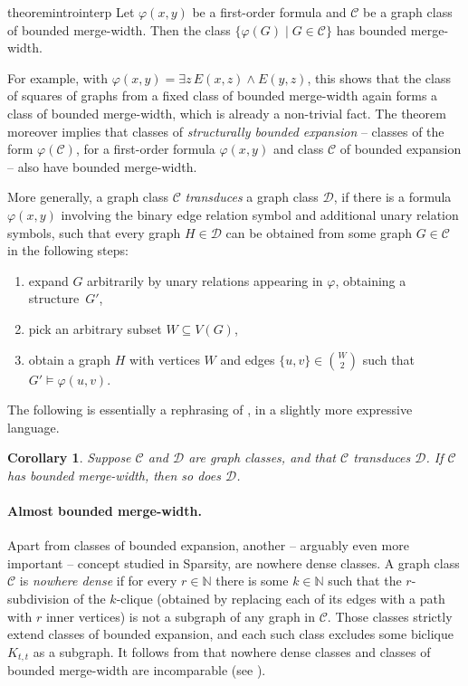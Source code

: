 \documentclass[11pt]{article}
\newtheorem{corollary}[theorem]{Corollary}
\theoremstyle{remark}
\newcommand{\set}[1]{\{#1\}}
\newcommand{\setof}[2]{\set{#1\mid#2}}
\def\phi{\varphi}
\def\cal{\mathcal}
\def\N{\mathbb N}
\renewcommand{\subset}{\subseteq}
\newcommand{\CC}{\cal C}
\newcommand{\DD}{\cal D}
\begin{document}
\begin{restatable}{theorem}{introinterp}\label{thm:interp}
  Let $\phi(x,y)$ be a first-order formula and
   $\CC$ be a graph class of bounded merge-width.
  Then the class $\setof{\phi(G)}{G\in\CC}$ has bounded merge-width.
\end{restatable}


For example, with \(\phi(x,y)=\exists z \,E(x,z) \land E(y,z)\),
this shows that the class of squares of graphs from a fixed class of bounded merge-width again forms a class of bounded merge-width, which is already a non-trivial fact.
The theorem moreover implies that classes
of \emph{structurally bounded expansion} \cite{lsd-journal}
-- classes of the form $\phi(\CC)$, for a first-order formula $\phi(x,y)$ and  class $\CC$ of bounded expansion -- also have bounded merge-width.

More generally, a graph class $\CC$ \emph{transduces} a graph class $\DD$,
if there is a formula $\phi(x,y)$ involving the binary edge relation symbol and additional unary relation symbols,
such that every graph $H\in\DD$ can be obtained from some graph $G\in\CC$
in the following steps:
\begin{enumerate}
  \item expand $G$ arbitrarily by unary relations appearing in $\phi$, obtaining a structure~$G'$,
  \item pick an arbitrary subset $W\subset V(G)$,
  \item obtain a graph $H$ with vertices $W$ and edges $\set{u,v}\in {W\choose 2}$ such that $G'\models\phi(u,v)$.
\end{enumerate}
\noindent
The following is essentially a rephrasing of , in a slightly more expressive language.
\begin{corollary}\label{cor:transduce}
  Suppose $\CC$ and $\DD$ are graph classes, and that $\CC$ transduces $\DD$.
  If $\CC$ has bounded merge-width, then so does $\DD$.
\end{corollary}

\paragraph{Almost bounded merge-width.}
Apart from classes of bounded expansion, another -- arguably even more important --
concept studied in Sparsity, are nowhere dense classes.
A graph class $\CC$ is \emph{nowhere dense} if for every $r\in\N$ there is some $k\in\N$
such that the $r$-subdivision  of the $k$-clique (obtained by replacing each of its edges with a path with $r$ inner vertices) is not a subgraph of any graph in $\CC$.
Those classes strictly extend classes of bounded expansion, and each such class excludes some biclique $K_{t,t}$ as a subgraph. It follows from 
that nowhere dense classes and classes of bounded merge-width are incomparable
(see ).
\end{document}
